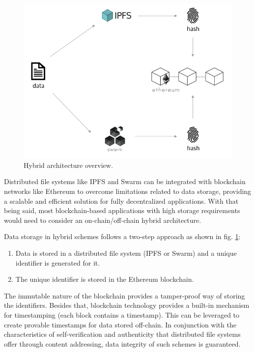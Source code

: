 \begin{figure}[htbp]
\centerline{\includegraphics[width=12cm]{figs/hybrid.png}}
\caption{Hybrid architecture overview.}
\label{fig: hybrid}
\end{figure}

Distributed file systems like IPFS and Swarm can be integrated with blockchain networks like Ethereum to overcome limitations related to data storage, providing a scalable and efficient solution for fully decentralized applications. With that being said, most blockchain-based applications with high storage requirements would need to consider an on-chain/off-chain hybrid architecture.

Data storage in hybrid schemes follows a two-step approach as shown in fig. \ref{fig: hybrid}:
\begin{enumerate}
\item Data is stored in a distributed file system (IPFS or Swarm) and a unique identifier is generated for it.
\item The unique identifier is stored in the Ethereum blockchain.
\end{enumerate}

The immutable nature of the blockchain provides a tamper-proof way of storing the identifiers. Besides that, blockchain technology provides a built-in mechanism for timestamping (each block contains a timestamp). This can be leveraged to create provable timestamps for data stored off-chain. In conjunction with the characteristics of self-verification and authenticity that distributed file systems offer through content addressing, data integrity of such schemes is guaranteed.

